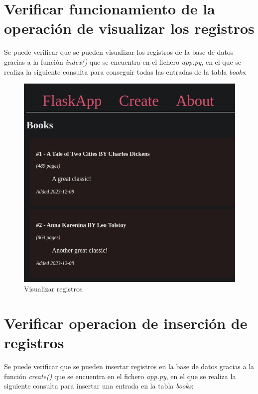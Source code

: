 \documentclass[11pt]{report}
\begin{document}
\section{Verificar funcionamiento de la operación de visualizar los registros}
Se puede verificar que se pueden visualizar los registros de la base de datos gracias a la función \emph{index()} que
se encuentra en el fichero \emph{app.py}, en el que se realiza la siguiente consulta para conseguir todas las entradas
de la tabla \emph{books}:
\lstset{style=mystyle}


\begin{figure}[H]
  \centering
  \includegraphics[scale=0.35]{img/visualizar_registros.png}
  \caption{Visualizar registros}
  \label{fig:visualizar_registros}
\end{figure}

\cleardoublepage

\section{Verificar operacion de inserción de registros}
Se puede verificar que se pueden insertar registros en la base de datos gracias a la función \emph{create()} que
se encuentra en el fichero \emph{app.py}, en el que se realiza la siguiente consulta para insertar una entrada
en la tabla \emph{books}:
\lstset{style=mystyle}

\end{document}
